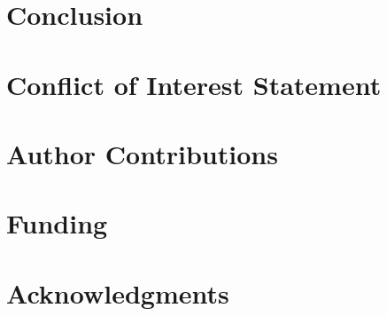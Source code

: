 \documentclass[manuscript,screen,review]{acmart}
\begin{document}
\section{Conclusion}

\section*{Conflict of Interest Statement}

\section*{Author Contributions}

\section*{Funding}

\section*{Acknowledgments}




\end{document}

